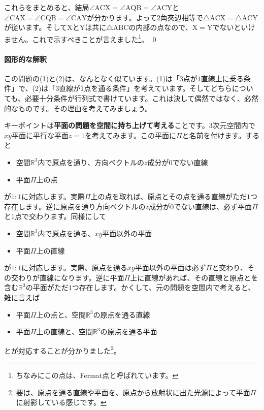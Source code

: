 これらをまとめると、結局$\angle\mathrm{ACX} = \angle\mathrm{AQB} = \angle\mathrm{ACY}$と$\angle\mathrm{CAX} = \angle\mathrm{CQB} = \angle\mathrm{CAY}$が分かります。よって$2$角夾辺相等で$\bigtriangleup\mathrm{ACX} = \bigtriangleup\mathrm{ACY}$が従います。そして$\mathrm{X}$と$\mathrm{Y}$は共に$\bigtriangleup\mathrm{ABC}$の内部の点なので、$\mathrm{X} = \mathrm{Y}$でないといけません。これで示すべきことが言えました\footnote{ちなみにこの点は、Fermat点と呼ばれています。}。 \qed

\paragraph{図形的な解釈}

この問題の(1)と(2)は、なんとなく似ています。(1)は「$3$点が$1$直線上に乗る条件」で、(2)は「$3$直線が$1$点を通る条件」を考えています。そしてどちらについても、必要十分条件が行列式で書けています。これは決して偶然ではなく、必然的なものです。その理由を考えてみましょう。

キーポイントは\textbf{平面の問題を空間に持ち上げて考える}ことです。$3$次元空間内で$xy$平面に平行な平面$z = 1$を考えてみます。この平面に$\Pi$と名前を付けます。すると
\begin{itemize}
\item 空間$\mathbb{R}^3$内で原点を通り、方向ベクトルの$z$成分が$0$でない直線
\item 平面$\Pi$上の点
\end{itemize}
が$1:1$に対応します。実際$\Pi$上の点を取れば、原点とその点を通る直線がただ$1$つ存在します。逆に原点を通り方向ベクトルの$z$成分が$0$でない直線は、必ず平面$\Pi$と$1$点で交わります。同様にして
\begin{itemize}
\item 空間$\mathbb{R}^3$内で原点を通る、$xy$平面以外の平面
\item 平面$\Pi$上の直線
\end{itemize}
が$1:1$に対応します。実際、原点を通る$xy$平面以外の平面は必ず$\Pi$と交わり、その交わりが直線になります。逆に平面$\Pi$上に直線があれば、その直線と原点とを含む$\mathbb{R}^3$の平面がただ$1$つ存在します。かくして、元の問題を空間内で考えると、雑に言えば
\begin{itemize}
\item 平面$\Pi$上の点と、空間$\mathbb{R}^3$の原点を通る直線
\item 平面$\Pi$上の直線と、空間$\mathbb{R}^3$の原点を通る平面
\end{itemize}
とが対応することが分かりました\footnote{要は、原点を通る直線や平面を、原点から放射状に出た光源によって平面$\Pi$に射影している感じです。}。

